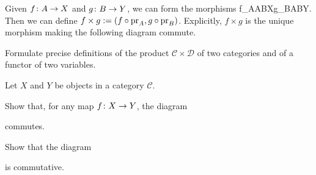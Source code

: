 \item Given $f\colon A\to X$ and $g\colon B\to Y$, we can form the morphisms
\bse
f\circ\pr_A\cl A\times B\to X\qquad {}\qquad g\circ \pr_B\cl A\times B\to Y.
\ese
Then we can define $f\times g:=(f\circ\mathrm{pr}_A,g\circ\mathrm{pr}_B)$. Explicitly, $f\times g$ is the unique morphism making the following diagram commute.
\bse
{}
\ese
\een
\es

\bx
Formulate precise definitions of the product $\mathcal{C}\times \mathcal{D}$ of two categories and of a functor of two variables.
\ex

\bs
\es

\bp
Let $X$ and $Y$ be objects in a category $\mathcal{C}$.
\ben[label=(\alph*)]
\item Show that, for any map $f\colon X \to Y$, the diagram
\bse
{}
\ese
commutes.
\item Show that the diagram
\bse
{}
\ese
is commutative.
\een
\ep

